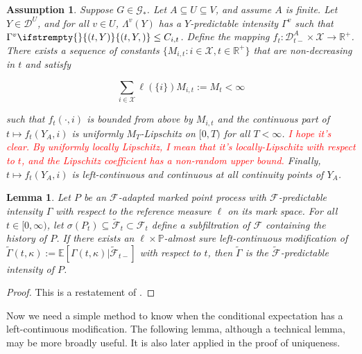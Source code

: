 \documentclass[12pt]{article}
\newcommand{\mb}{\mathbb}
\newcommand{\mc}{\mathcal}
\newcommand{\ra}{\rightarrow}
\newcommand{\tr}{\textcolor{red}}
\newcommand{\pr}{\mb{P}}							%
\newcommand{\ex}[1]{\mb{E}\left[#1\right]}			%
\newcommand{\defeq}{:=}								%
\newcommand{\cad}{\mc{D}}							%
\newcommand{\sta}{\mc{X}}							%
\newcommand{\Sm}{\ell}								%
\newcommand{\F}{\mc{F}}								%
\newcommand{\vind}[1]{_{#1}}						%
\newcommand{\vpara}[1]{^{#1}}						%
\newcommand{\tpara}[1]{_{#1}}						%
\newcommand{\jumpibd}[2]{C_{#1,#2}}					%
\newcommand{\Gs}{\mc{G}_\ast}						%
\newcommand{\tmepro}[3]{
\ifstrempty{#3}{
	(#1,#2)}{
	(#1,#2,#3)}}									%
\newcommand{\Xg}{Y}									%
\newcommand{\alt}[1]{\tilde{#1}}					%
\newcommand{\pmap}{\Lambda}							%
\renewcommand{\mark}{\kappa}						%
\newcommand{\ratee}{\Gamma}							%
\newcommand{\cratee}{\alt{\ratee}}					%
\newcommand{\rp}{P}									%
\newcommand{\const}{M}								%
\newcommand{\sttpara}[2]{_{#1,#2}}					%
\newtheorem{lem}[thms]{Lemma}
\newtheorem{assu}{Assumption}
\begin{document}
\begin{assu}
Suppose \(G \in \Gs\). Let \(A \subseteq U \subseteq V\), and assume \(A\) is finite. Let \(\Xg \in \cad\vpara{U}\), and for all \(v \in U\), \(\pmap\vpara{v}(\Xg)\) has a \(\Xg\)-predictable intensity \(\ratee\vpara{v}\) such that \(\ratee\vpara{v}\tmepro{t}{\Xg}{} \leq \jumpibd{i}{t}\). Define the mapping \(f_t: \cad\vpara{A}\tpara{t-}\times\sta \ra \mb{R}^+\). There exists a sequence of constants \(\{\const\sttpara{i}{t}:i \in \sta,t \in \mb{R}^+\}\) that are non-decreasing in \(t\) and satisfy

\[\sum_{i \in \sta}\Sm(\{i\})\const\sttpara{i}{t} \defeq \const\tpara{t} < \infty\]

such that \(f_t(\cdot,i)\) is bounded from above by \(\const\sttpara{i}{t}\) and the continuous part of \(t \mapsto f_t(\Xg\vind{A},i)\) is uniformly \(\const\tpara{T}\)-Lipschitz on \([0,T)\) for all \(T < \infty\). \tr{I hope it's clear. By uniformly locally Lipschitz, I mean that it's locally-Lipschitz with respect to \(t\), and the Lipschitz coefficient has a non-random upper bound.} Finally, \(t \mapsto f_t(\Xg\vind{A},i)\) is left-continuous and continuous at all continuity points of \(\Xg\vind{A}\).
\label{Ex::Eassu}
\end{assu}


\begin{lem}
Let \(\rp\) be an \(\F\)-adapted marked point process with \(\F\)-predictable intensity \(\ratee\) with respect to the reference measure \(\Sm\) on its mark space. For all \(t \in [0,\infty)\), let \(\sigma(\rp_{t}) \subseteq \alt{\F}_{t}\subset \F_{t}\) define a subfiltration of \(\F\) containing the history of \(\rp\). If there exists an \(\ell\times \pr\)-almost sure left-continuous modification of \(\cratee(t,\mark) := \ex{\ratee(t,\mark)|\alt{\F}_{t-}}\) with respect to \(t\), then \(\cratee\) is the \(\alt{\F}\)-predictable intensity of \(\rp\). 
\label{Ex::filtering}
\end{lem}

\begin{proof}
This is a restatement of \cite[theorem 14.3.III]{DalVer08}.
\end{proof}

Now we need a simple method to know when the conditional expectation has a left-continuous modification. The following lemma, although a technical lemma, may be more broadly useful. It is also later applied in the proof of uniqueness.
\end{document}
